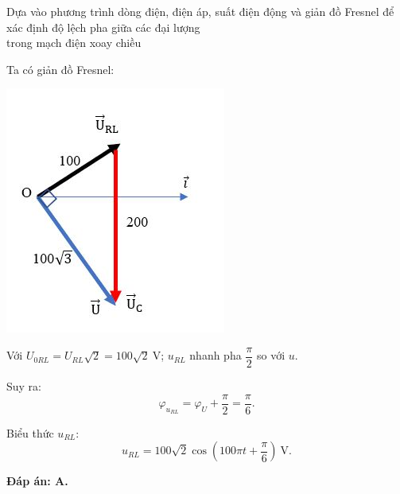 \begin{dang}{Dựa vào phương trình dòng điện, điện áp, suất điện động  và giản đồ Fresnel để xác định độ lệch pha giữa các đại lượng\\ trong mạch điện xoay chiều}
{		Ta có giản đồ Fresnel:
		\begin{center}
			\includegraphics[scale=0.9]{../figs/VN12-PH-19-A-011-4-V2-4.JPG}
		\end{center}
		
		Với $U_{0RL} =U_{RL} \sqrt 2 =100 \sqrt 2\ \text{V}$; $u_{RL}$ nhanh pha $\dfrac{\pi}{2}$ so với $u$.
		
		Suy ra: $$\varphi_{u_{RL}} =\varphi_U + \dfrac{\pi}{2} = \dfrac{\pi}{6}.$$
		
		Biểu thức $u_{RL}$:
		$$u_{RL} = 100\sqrt 2 \cos \left (100\pi t + \dfrac{\pi}{6}\right)\ \text{V}.$$
		
		\textbf{Đáp án: A.}
	}
	
	
\end{dang}
